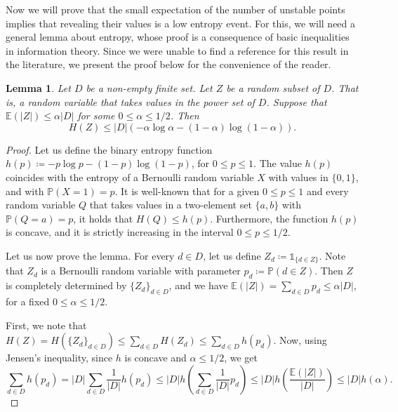 \documentclass[reqno,oneside,11pt]{amsart}
\renewcommand{\P}{\mathbb{P}}
\newcommand{\E}{\mathbb{E}}
\theoremstyle{plain}
\newtheorem{lem}[thm]{Lemma}
\theoremstyle{definition}
\begin{document}
Now we will prove that the small expectation of the number of unstable points implies that revealing their values is a low entropy event. For this, we will need a general lemma about entropy, whose proof is a consequence of basic inequalities in information theory. Since we were unable to find a reference for this result in the literature, we present the proof below for the convenience of the reader.
\begin{lem}\label{lem: low expectation implies low entropy} Let $D$ be a non-empty finite set. Let $Z$ be a random subset of $D$. That is, a random variable that takes values in the power set of $D$. Suppose that $\E(|Z|)\le \alpha |D|$ for some $0\le \alpha \le 1/2$. Then
	\begin{equation*}
		H(Z)\le |D|(-\alpha \log \alpha - (1-\alpha)\log (1-\alpha)).
	\end{equation*}
\end{lem}
\begin{proof}
	Let us define the binary entropy function $h(p)\coloneqq -p\log p -(1-p)\log (1-p)$, for $0\le p \le 1$. The value $h(p)$ coincides with the entropy of a Bernoulli random variable $X$ with values in $\{0,1\}$, and with $\P(X=1)=p$. It is well-known that for a given $0\le p\le 1$ and every random variable $Q$ that takes values in a two-element set $\{a,b\}$ with $\P(Q=a)=p$, it holds that $H(Q)\le h(p)$. Furthermore, the function $h(p)$ is concave, and it is strictly increasing in the interval $0\le p \le 1/2$.
	
	Let us now prove the lemma. For every $d\in D$, let us define $Z_d\coloneqq \mathds{1}_{ \{d\in Z\} }$. Note that $Z_d$ is a Bernoulli random variable with parameter $p_d\coloneqq \P(d\in Z)$. Then $Z$ is completely determined by $\{Z_d\}_{d\in D}$, and we have $\E(|Z|)=\sum_{d\in D}p_d\le \alpha |D|$, for a fixed $0\le \alpha \le 1/2$.
	
	First, we note that $
		H(Z)=H(\{Z_d \}_{d\in D})\le \sum_{d\in D}H(Z_d) \le \sum_{d\in D}h(p_d).$
	Now, using Jensen's inequality, since $h$ is concave and $\alpha\le 1/2$, we get 
	\begin{equation*}
		\sum_{d\in D}h(p_d)=|D|\sum_{d\in D}\frac{1}{|D|}h(p_d)\le |D|h\left(\sum_{d\in D}\frac{1}{|D|}p_d \right)\le |D|h\left(\frac{\E(|Z|)}{|D|} \right)\le|D|h(\alpha).
	\end{equation*}
\end{proof}
\end{document}
